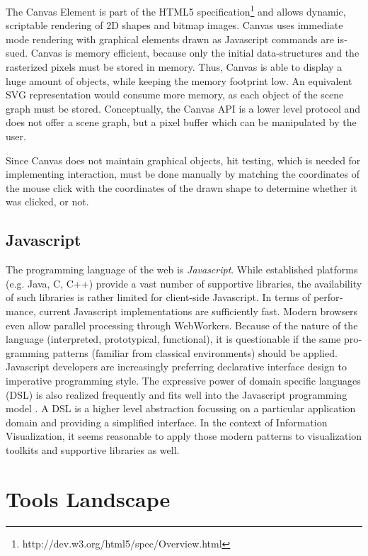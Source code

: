 \begin{english}
The Canvas Element is part of the HTML5 specification\footnote{http://dev.w3.org/html5/spec/Overview.html} and allows dynamic, scriptable rendering of 2D shapes and bitmap images. Canvas uses immediate mode rendering with graphical elements drawn as Javascript commands are issued. Canvas is memory efficient, because only the initial data-structures and the rasterized pixels must be stored in memory. Thus, Canvas is able to display a huge amount of objects, while keeping the memory footprint low. An equivalent SVG representation would consume more memory, as each object of the scene graph must be stored. Conceptually, the Canvas API is a lower level protocol and does not offer a scene graph, but a pixel buffer which can be manipulated by the user.

Since Canvas does not maintain graphical objects, hit testing, which is needed for implementing interaction, must be done manually by matching the coordinates of the mouse click with the coordinates of the drawn shape to determine whether it was clicked, or not.


\subsection{Javascript}

The programming language of the web is \emph{Javascript}. While established platforms (e.g. Java, C, C++) provide a vast number of supportive libraries, the availability of such libraries is rather limited for client-side Javascript. In terms of performance, current Javascript implementations are sufficiently fast. Modern browsers even allow parallel processing through WebWorkers. Because of the nature of the language (interpreted, prototypical, functional), it is questionable if the same programming patterns (familiar from classical environments) should be applied. Javascript developers are increasingly preferring declarative interface design to imperative programming style. The expressive power of domain specific languages (DSL) is also realized frequently and fits well into the Javascript programming model \cite{deursen2000}. A DSL is a higher level abstraction focussing on a particular application domain and providing a simplified interface. In the context of Information Visualization, it seems reasonable to apply those modern patterns to visualization toolkits and supportive libraries as well.

\section{Tools Landscape}


\end{english}
